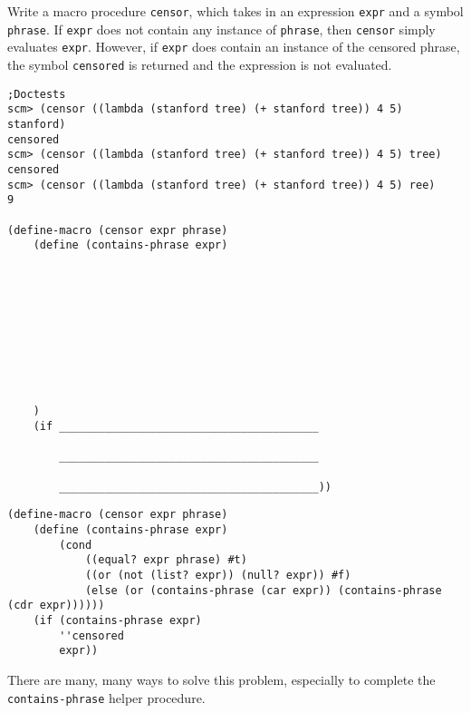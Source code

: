 \begin{blocksection}
\question Write a macro procedure \lstinline{censor}, which takes in an expression \lstinline{expr} and a symbol \lstinline{phrase}. If \lstinline{expr} does not contain any instance of \lstinline{phrase}, then \lstinline{censor} simply evaluates \lstinline{expr}. However, if \lstinline{expr} does contain an instance of the censored phrase, the symbol \lstinline{censored} is returned and the expression is not evaluated.

\begin{lstlisting}
;Doctests
scm> (censor ((lambda (stanford tree) (+ stanford tree)) 4 5) stanford)
censored
scm> (censor ((lambda (stanford tree) (+ stanford tree)) 4 5) tree)
censored
scm> (censor ((lambda (stanford tree) (+ stanford tree)) 4 5) ree)
9

(define-macro (censor expr phrase)
    (define (contains-phrase expr)
    
    
    
    
    




    
    )
    (if ________________________________________

        ________________________________________

        ________________________________________))
\end{lstlisting}

\begin{solution}
\begin{lstlisting}
(define-macro (censor expr phrase)
    (define (contains-phrase expr)
        (cond 
            ((equal? expr phrase) #t)
            ((or (not (list? expr)) (null? expr)) #f)
            (else (or (contains-phrase (car expr)) (contains-phrase (cdr expr))))))
    (if (contains-phrase expr)
        ''censored
        expr))
\end{lstlisting}
\end{solution}

\begin{questionmeta}
There are many, many ways to solve this problem, especially to complete the \lstinline{contains-phrase} helper procedure. 
\end{questionmeta}
\end{blocksection}